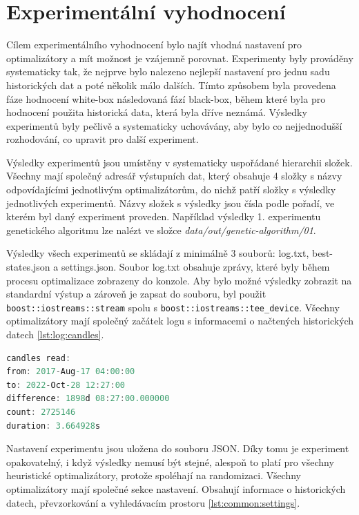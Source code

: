 \chapter{Experimentální vyhodnocení}
Cílem experimentálního vyhodnocení bylo najít vhodná nastavení pro optimalizátory a mít možnost je vzájemně porovnat.
Experimenty byly prováděny systematicky tak, že nejprve bylo nalezeno nejlepší nastavení pro jednu sadu historických dat a poté několik málo dalších.
Tímto způsobem byla provedena fáze hodnocení white-box následovaná fází black-box, během které byla pro hodnocení použita historická data, která byla dříve neznámá.
Výsledky experimentů byly pečlivě a systematicky uchovávány, aby bylo co nejjednodušší rozhodování, co upravit pro další experiment.

Výsledky experimentů jsou umístěny v systematicky uspořádané hierarchii složek.
Všechny mají společný adresář výstupních dat, který obsahuje 4 složky s názvy odpovídajícími jednotlivým optimalizátorům, do nichž patří složky s výsledky jednotlivých experimentů.
Názvy složek s výsledky jsou čísla podle pořadí, ve kterém byl daný experiment proveden.
Například výsledky 1. experimentu genetického algoritmu lze nalézt ve složce \textit{data/out/genetic-algorithm/01}.

Výsledky všech experimentů se skládají z minimálně 3 souborů: log.txt, best-states.json a settings.json.
Soubor log.txt obsahuje zprávy, které byly během procesu optimalizace zobrazeny do konzole.
Aby bylo možné výsledky zobrazit na standardní výstup a zároveň je zapsat do souboru, byl použit \texttt{boost::iostreams::stream} spolu s \texttt{boost::iostreams::tee\_device}.
Všechny optimalizátory mají společný začátek logu s informacemi o načtených historických datech \ref{lst:log:candles}.

\begin{lstlisting}[caption={~Informace o načtených historických svíčkách z výstupního logu},label={lst:log:candles},captionpos=t,abovecaptionskip=-\medskipamount,belowcaptionskip=\medskipamount,language=C]
candles read:
from: 2017-Aug-17 04:00:00
to: 2022-Oct-28 12:27:00
difference: 1898d 08:27:00.000000
count: 2725146
duration: 3.664928s
\end{lstlisting}

Nastavení experimentu jsou uložena do souboru JSON.
Díky tomu je experiment opakovatelný, i když výsledky nemusí být stejné, alespoň to platí pro všechny heuristické optimalizátory, protože spoléhají na randomizaci.
Všechny optimalizátory mají společné sekce nastavení.
Obsahují informace o historických datech, převzorkování a vyhledávacím prostoru \ref{lst:common:settings}.

